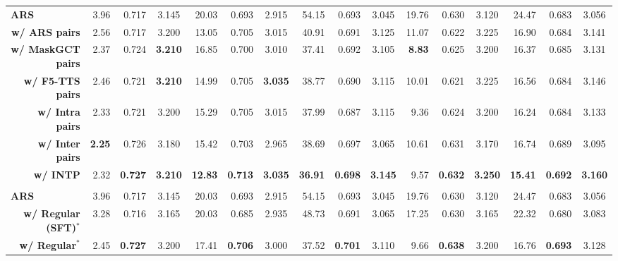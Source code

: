 \documentclass[11pt]{article}
\begin{document}
\begin{table}[t]
\begin{center}
{\begin{threeparttable}
\begin{tabular}{c||rrc|rrc|rrc|rrc||rrc}
    \midrule 
    \rowcolor{gray!30} \multicolumn{16}{c}{\textbf{\textit{Group 2: Effect of Data across Different Models}}} \\
    \midrule 
    \multicolumn{1}{l||}{\textbf{ARS}~\cite{maskgct}} & 3.96 & 0.717 & 3.145 & 20.03 & 0.693 & 2.915 & 54.15 & 0.693 & 3.045 & 19.76 & 0.630 & 3.120 & 24.47 & 0.683 & 3.056 \\ \cmidrule(lr){1-16}
    \multicolumn{1}{r||}{\textbf{w/ ARS pairs}} & 2.56 & 0.717 & 3.200 & 13.05 & 0.705 & 3.015 & 40.91 & 0.691 & 3.125 & 11.07 & 0.622 & 3.225 & 16.90 & 0.684 & 3.141 \\
    \multicolumn{1}{r||}{\textbf{w/ MaskGCT pairs}} & 2.37 & 0.724 & \textbf{3.210} & 16.85 & 0.700 & 3.010 & 37.41 & 0.692 & 3.105 & \textbf{8.83} & 0.625 & 3.200 & 16.37 & 0.685 & 3.131 \\
    \multicolumn{1}{r||}{\textbf{w/ F5-TTS pairs}} & 2.46 & 0.721 & \textbf{3.210} & 14.99 & 0.705 & \textbf{3.035} & 38.77 & 0.690 & 3.115 & 10.01 & 0.621 & 3.225 & 16.56 & 0.684 & 3.146 \\ \midrule
    \multicolumn{1}{r||}{\textbf{w/ Intra pairs}} & 2.33 & 0.721 & 3.200 & 15.29 & 0.705 & 3.015 & 37.99 & 0.687 & 3.115 & 9.36 & 0.624 & 3.200 & 16.24 & 0.684 & 3.133 \\
    \multicolumn{1}{r||}{\textbf{w/ Inter pairs}} & \textbf{2.25} & 0.726 & 3.180 & 15.42 & 0.703 & 2.965 & 38.69 & 0.697 & 3.065 & 10.61 & 0.631 & 3.170 & 16.74 & 0.689 & 3.095 \\ \midrule
    \multicolumn{1}{r||}{\textbf{w/ INTP}} & 2.32 & \textbf{0.727} & \textbf{3.210} & \textbf{12.83} & \textbf{0.713} & \textbf{3.035} & \textbf{36.91} & \textbf{0.698} & \textbf{3.145} & 9.57 & \textbf{0.632} & \textbf{3.250} & \textbf{15.41} & \textbf{0.692} & \textbf{3.160} \\
    \midrule 
    \rowcolor{gray!30} \multicolumn{16}{c}{\textbf{\textit{Group 3: Effect of Different Negative Samples}}} \\
    \midrule 
    \multicolumn{1}{l||}{\textbf{ARS}~\cite{maskgct}} & 3.96 & 0.717 & 3.145 & 20.03 & 0.693 & 2.915 & 54.15 & 0.693 & 3.045 & 19.76 & 0.630 & 3.120 & 24.47 & 0.683 & 3.056 \\ \cmidrule(lr){1-16}
    \multicolumn{1}{r||}{\textbf{w/ Regular (SFT)}$^*$} & 3.28 & 0.716 & 3.165 & 20.03 & 0.685 & 2.935 & 48.73 & 0.691 & 3.065 & 17.25 & 0.630 & 3.165 & 22.32 & 0.680 & 3.083 \\
    \multicolumn{1}{r||}{\textbf{w/ Regular$^*$}} & 2.45 & \textbf{0.727} & 3.200 & 17.41 & \textbf{0.706} & 3.000 & 37.52 & \textbf{0.701} & 3.110 & 9.66 & \textbf{0.638} & 3.200 & 16.76 & \textbf{0.693} & 3.128 \\

\end{tabular}
\end{threeparttable}}
\end{center}
\end{table}
\end{document}
